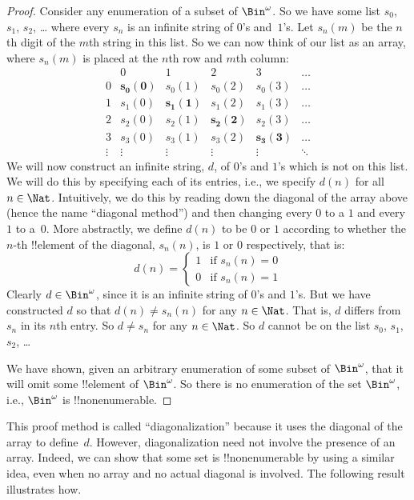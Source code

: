 \documentclass[../../../include/open-logic-section]{subfiles}
\begin{document}
\begin{proof}
Consider any enumeration of a subset of $\Bin^\omega$. So we have some
list $s_{0}$, $s_{1}$, $s_{2}$, \dots{} where every $s_n$ is an
infinite string of $0$'s and~$1$'s. Let $s_n(m)$ be the $n$th digit of
the $m$th string in this list. So we can now think of our list as an
array, where $s_n(m)$ is placed at the $n$th row and $m$th column:
\[
\begin{array}{c|c|c|c|c|c}
& 0 & 1 & 2 & 3 & \dots \\\hline
0 & \mathbf{s_{0}(0)} & s_{0}(1) & s_{0}(2) & s_0(3) & \dots \\\hline
1 & s_{1}(0)& \mathbf{s_{1}(1)} & s_1(2) & s_1(3) & \dots \\\hline
2 & s_{2}(0)& s_{2}(1) & \mathbf{s_2(2)} & s_2(3) & \dots \\\hline
3 & s_{3}(0)& s_{3}(1) & s_3(2) & \mathbf{s_3(3)} & \dots \\\hline
\vdots & \vdots & \vdots & \vdots & \vdots & \mathbf{\ddots}
\end{array}
\]
We will now construct an infinite string, $d$, of $0$'s and $1$'s
which is not on this list.  We will do this by specifying each of its
entries, i.e., we specify $d(n)$ for all $n \in \Nat$.  Intuitively,
we do this by reading down the diagonal of the array above (hence the
name ``diagonal method'') and then changing every $0$ to a $1$ and
every $1$ to a~$0$. More abstractly, we define $d(n)$ to be $0$ or $1$
according to whether the $n$-th !!{element} of the diagonal, $s_n(n)$,
is $1$ or $0$ respectively, that is:
\[
d(n) =
\begin{cases}
1 & \text{if $s_{n}(n) = 0$}\\
0 & \text{if $s_{n}(n) = 1$}
\end{cases}
\]
Clearly $d \in \Bin^\omega$, since it is an infinite string of $0$'s
and $1$'s. But we have constructed $d$ so that $d(n) \neq s_n(n)$ for
any $n \in \Nat$. That is, $d$ differs from $s_n$ in its $n$th entry.
So $d \neq s_n$ for any $n\in \Nat$. So $d$ cannot be on the list
$s_0$, $s_1$, $s_2$,
\dots

We have shown, given an arbitrary enumeration of some subset of
$\Bin^\omega$, that it will omit some !!{element} of $\Bin^\omega$. So
there is no enumeration of the set $\Bin^\omega$, i.e., $\Bin^\omega$
is !!{nonenumerable}.
\end{proof}

\begin{explain}
This proof method is called ``diagonalization'' because it uses the
diagonal of the array to define~$d$. However, diagonalization need
not involve the presence of an array. Indeed, we can show that some set is 
!!{nonenumerable} by using a similar idea, even when no array and no
actual diagonal is involved. The following result illustrates how.
\end{explain}
\end{document}
